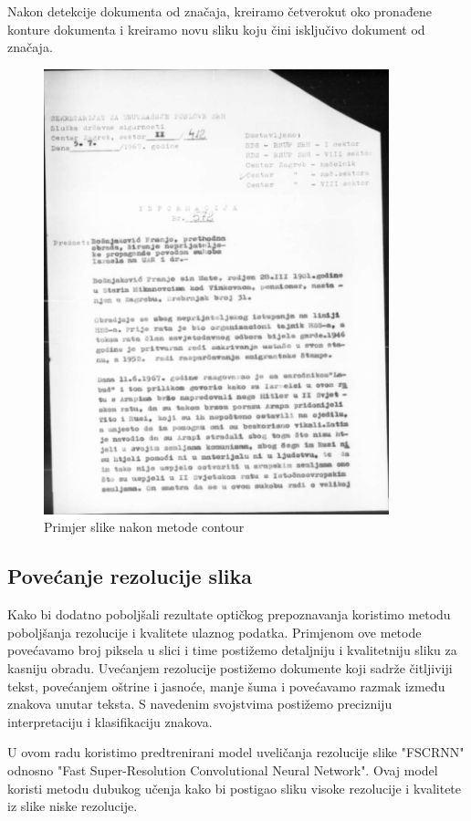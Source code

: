 \documentclass[times, utf8, zavrsni, numeric]{fer}
\begin{document}
\pagebreak
Nakon detekcije dokumenta od značaja, kreiramo četverokut oko pronađene konture dokumenta i kreiramo novu sliku koju čini isključivo dokument od značaja.
\\
\begin{figure}[H]
    \centering
    \includegraphics[width=10cm]{images/vise kontura max slika.jpg}
    \caption{Primjer slike nakon metode contour}
	\label{fig:example_deskewed}
\end{figure}

\subsection{Povećanje rezolucije slika}
Kako bi dodatno poboljšali rezultate optičkog prepoznavanja koristimo metodu poboljšanja rezolucije i kvalitete ulaznog podatka. Primjenom ove metode povećavamo broj piksela u slici i time postižemo detaljniju i kvalitetniju sliku za kasniju obradu. Uvećanjem rezolucije postižemo dokumente koji sadrže čitljiviji tekst, povećanjem oštrine i jasnoće, manje šuma i povećavamo razmak između znakova unutar teksta. S navedenim svojstvima postižemo precizniju interpretaciju i klasifikaciju znakova.

U ovom radu koristimo predtrenirani model uveličanja rezolucije slike "FSCRNN" odnosno "Fast Super-Resolution Convolutional Neural Network". Ovaj model koristi metodu dubukog učenja kako bi postigao sliku visoke rezolucije i kvalitete iz slike niske rezolucije.
\end{document}
